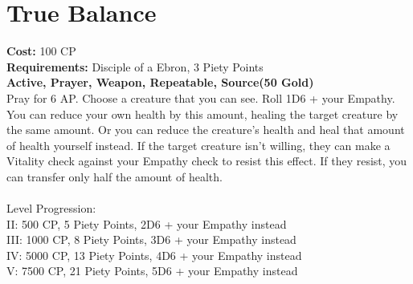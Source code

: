 \section{True Balance}
\textbf{Cost:} 100 CP\\
\textbf{Requirements:} Disciple of a Ebron, 3 Piety Points \\
\textbf{Active, Prayer, Weapon, Repeatable, Source(50 Gold)}\\
Pray for 6 AP. Choose a creature that you can see. Roll 1D6 + your Empathy. You can reduce your own health by this amount, healing the target creature by the same amount. Or you can reduce the creature's health and heal that amount of health yourself instead. If the target creature isn't willing, they can make a Vitality check against your Empathy check to resist this effect. If they resist, you can transfer only half the amount of health.\\
\\
Level Progression:\\
II: 500 CP, 5 Piety Points, 2D6 + your Empathy instead\\
III: 1000 CP, 8 Piety Points, 3D6 + your Empathy instead\\
IV: 5000 CP, 13 Piety Points, 4D6 + your Empathy instead\\
V: 7500 CP, 21 Piety Points, 5D6 + your Empathy instead\\